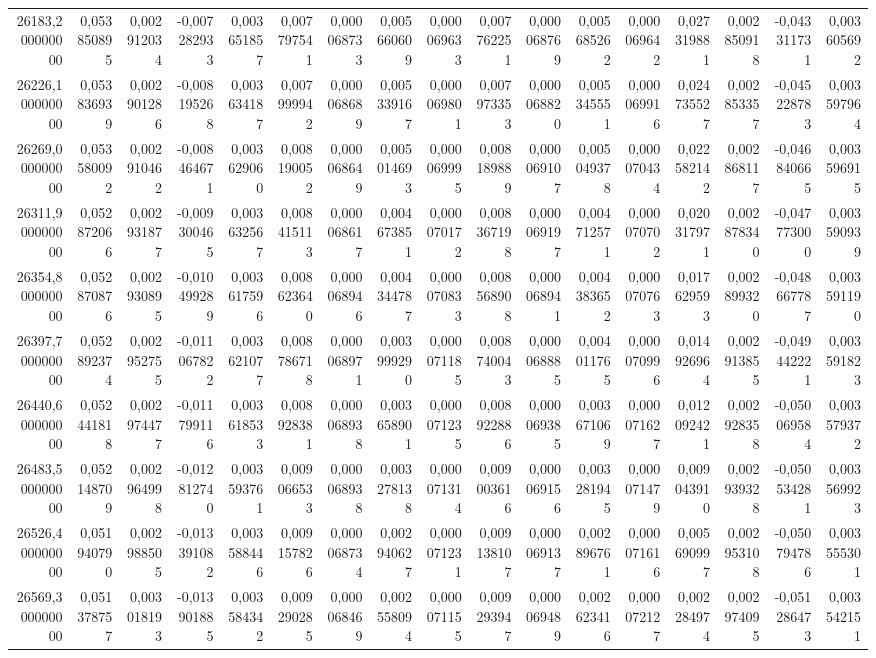 \begin{longtable}{rrrrrrrrrrrrrrrrr}
26183,200000000 & 0,053850895 & 0,002912034 & -0,007282933 & 0,003651857 & 0,007797541 & 0,000068733 & 0,005660609 & 0,000069633 & 0,007762251 & 0,000068769 & 0,005685262 & 0,000069642 & 0,027319881 & 0,002850918 & -0,043311731 & 0,003605692\\
26226,100000000 & 0,053836939 & 0,002901286 & -0,008195268 & 0,003634187 & 0,007999942 & 0,000068689 & 0,005339167 & 0,000069801 & 0,007973353 & 0,000068820 & 0,005345551 & 0,000069916 & 0,024735527 & 0,002853357 & -0,045228783 & 0,003597964\\
26269,000000000 & 0,053580092 & 0,002910462 & -0,008464671 & 0,003629060 & 0,008190052 & 0,000068649 & 0,005014693 & 0,000069995 & 0,008189889 & 0,000069107 & 0,005049378 & 0,000070434 & 0,022582142 & 0,002868117 & -0,046840665 & 0,003596915\\
26311,900000000 & 0,052872066 & 0,002931877 & -0,009300465 & 0,003632567 & 0,008415113 & 0,000068617 & 0,004673851 & 0,000070172 & 0,008367198 & 0,000069197 & 0,004712571 & 0,000070702 & 0,020317971 & 0,002878340 & -0,047773000 & 0,003590939\\
26354,800000000 & 0,052870876 & 0,002930895 & -0,010499289 & 0,003617596 & 0,008623640 & 0,000068946 & 0,004344787 & 0,000070833 & 0,008568908 & 0,000068941 & 0,004383652 & 0,000070763 & 0,017629593 & 0,002899320 & -0,048667787 & 0,003591190\\
26397,700000000 & 0,052892374 & 0,002952755 & -0,011067822 & 0,003621077 & 0,008786718 & 0,000068971 & 0,003999290 & 0,000071185 & 0,008740043 & 0,000068885 & 0,004011765 & 0,000070996 & 0,014926964 & 0,002913855 & -0,049442221 & 0,003591823\\
26440,600000000 & 0,052441818 & 0,002974477 & -0,011799116 & 0,003618533 & 0,008928381 & 0,000068938 & 0,003658901 & 0,000071235 & 0,008922886 & 0,000069385 & 0,003671069 & 0,000071627 & 0,012092421 & 0,002928358 & -0,050069584 & 0,003579372\\
26483,500000000 & 0,052148709 & 0,002964998 & -0,012812740 & 0,003593761 & 0,009066533 & 0,000068938 & 0,003278138 & 0,000071314 & 0,009003616 & 0,000069156 & 0,003281945 & 0,000071479 & 0,009043910 & 0,002939328 & -0,050534281 & 0,003569923\\
26526,400000000 & 0,051940790 & 0,002988505 & -0,013391082 & 0,003588446 & 0,009157826 & 0,000068734 & 0,002940627 & 0,000071231 & 0,009138107 & 0,000069137 & 0,002896761 & 0,000071616 & 0,005690997 & 0,002953108 & -0,050794786 & 0,003555301\\
26569,300000000 & 0,051378757 & 0,003018193 & -0,013901885 & 0,003584342 & 0,009290285 & 0,000068469 & 0,002558094 & 0,000071155 & 0,009293947 & 0,000069489 & 0,002623416 & 0,000072127 & 0,002284974 & 0,002974095 & -0,051286473 & 0,003542151\\

\end{longtable}
